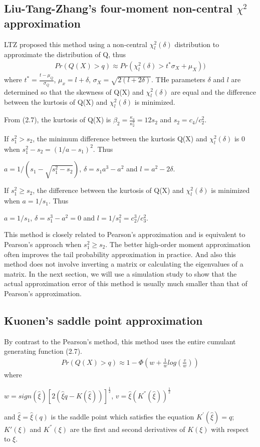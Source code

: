 \documentclass[paper=a4]{article}
\numberwithin{equation}{section}
\begin{document}
\subsection{ Liu-Tang-Zhang's four-moment non-central $\chi^2$ approximation}

LTZ proposed this method using a non-central $\chi_l^2(\delta)$ distribution to approximate the distribution of Q, thus
\begin{align}
Pr(Q(X)>q)\approx Pr(\chi_l^2(\delta) >t^*\sigma_X+\mu_X))
\end{align}
where 	$t^*=\frac{t-\mu_Q}{\sigma_Q}$, $\mu_x = l+\delta$, $\sigma_X=\sqrt{2(l+2\delta)}$. THe parameters $\delta$ and $l$ are determined so that the skewness of Q(X) and $\chi_l^2(\delta)$ are equal and the difference between the kurtosis of Q(X) and $\chi_l^2(\delta)$ is minimized.

From (2.7), the kurtosis of Q(X) is $\beta_2=\frac{\kappa_4}{\kappa_2^2}=12s_2$ and $s_2=c_4/c_2^2$. 

If $s_1^2 >s_2$, the minimum difference between the kurtosis Q(X) and $\chi_l^2(\delta)$ is 0 when $s_1^2-s_2=(1/a-s_1)^2$. Thus 
\begin{center}
$a=1/(s_1-\sqrt{s_1^2-s_2})$,   $\delta=s_1a^3-a^2$ and $l=a^2-2\delta$.
\end{center}

If $s_1^2\geq s_2$, the difference between the kurtosis of Q(X) and $\chi_l^2(\delta)$ is minimized when $a=1/s_1$. Thus
\begin{center}
	$a=1/s_1$, $\delta=s_1^3-a^2=0$ and $l=1/s_1^2=c_2^3/c_3^2$.
\end{center}

This method is closely related to Pearson's approximation and is equivalent to Pearson's approach when $s_1^2\geq s_2$. The better high-order moment approximation often improves the tail probability approximation in practice. And also this method does not involve inverting a matrix or calculating the eigenvalues of a matrix. In the next section, we will use a simulation study to show that the actual approximation error of this method is usually much smaller than that of Pearson's approximation.

\subsection{Kuonen's saddle point approximation}
By contrast to the Pearson's method, this method uses the entire cumulant generating function (2.7).
\begin{align}
Pr(Q(X)>q)\approx 1-\Phi(w+\frac{1}{w}log(\frac{v}{w}))
\end{align}
where 
\begin{center}
$w=sign(\hat{\xi})[2(\hat{\xi}q-K(\hat{\xi}))]^{\frac{1}{2}}$,  $v=\hat{\xi}(K^{''}(\hat{\xi}))^{\frac{1}{2}}$
\end{center}
and $\hat{\xi}=\hat{\xi}(q)$ is the saddle point which satisfies the equation $K^{'}(\hat{\xi})=q$;
$K'(\xi)$ and $K^{''}(\xi)$ are the first and second derivatives of $K(\xi)$ with respect to $\xi$.
\end{document}
